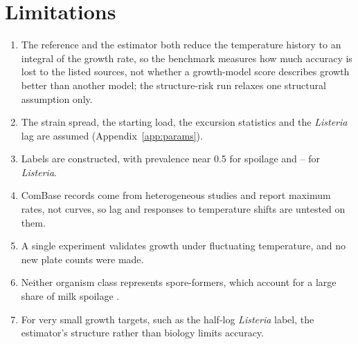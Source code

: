 \documentclass[11pt,a4paper,twoside,openany]{book}
\theoremstyle{plain}\newtheorem{proposition}{Proposition}\newtheorem{corollary}{Corollary}
\theoremstyle{definition}\newtheorem{definition}{Definition}[chapter]
\begin{document}
\section{Limitations}
\begin{enumerate}[label=(\roman*)]
\item The reference and the estimator both reduce the temperature history to an integral of the growth rate, so the benchmark measures how much accuracy is lost to the listed sources, not whether a growth-model score describes growth better than another model; the structure-risk run relaxes one structural assumption only.
\item The strain spread, the starting load, the excursion statistics and the \textit{Listeria} lag are assumed (Appendix~\ref{app:params}).
\item Labels are constructed, with prevalence near 0.5 for spoilage and \NumLisPrevMin--\NumLisPrevMax{} for \textit{Listeria}.
\item ComBase records come from heterogeneous studies and report maximum rates, not curves, so lag and responses to temperature shifts are untested on them.
\item A single experiment validates growth under fluctuating temperature, and no new plate counts were made.
\item Neither organism class represents spore-formers, which account for a large share of milk spoilage \cite{martin2021}.
\item For very small growth targets, such as the half-log \textit{Listeria} label, the estimator's structure rather than biology limits accuracy.
\end{enumerate}

\end{document}
